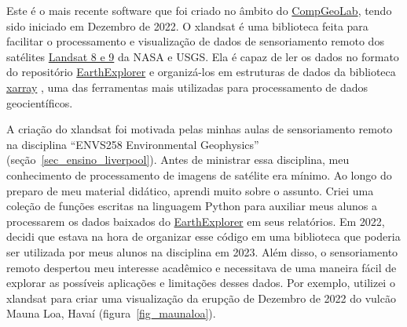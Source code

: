 \documentclass[10pt,a4paper,oneside]{book}
\begin{document}
Este é o mais recente software que foi criado no âmbito do
\href{https://www.compgeolab.org}{CompGeoLab}, tendo sido iniciado em Dezembro
de 2022.
O xlandsat é uma biblioteca feita para facilitar o processamento e visualização
de dados de sensoriamento remoto dos satélites
\href{https://en.wikipedia.org/wiki/Landsat_program}{Landsat 8 e 9} da
NASA e USGS.
Ela é capaz de ler os dados no formato do repositório
\href{https://earthexplorer.usgs.gov/}{EarthExplorer} e organizá-los em
estruturas de dados da biblioteca \href{https://xarray.dev/}{xarray}
\citep{Hoyer2017}, uma das ferramentas mais utilizadas para processamento de
dados geocientíficos.

A criação do xlandsat foi motivada pelas minhas aulas de sensoriamento
remoto na disciplina ``ENVS258 Environmental Geophysics''
(seção~\ref{sec_ensino_liverpool}).
Antes de ministrar essa disciplina, meu conhecimento de processamento de
imagens de satélite era mínimo.
Ao longo do preparo de meu material didático, aprendi muito sobre o assunto.
Criei uma coleção de funções escritas na linguagem Python para auxiliar meus
alunos a processarem os dados baixados do
\href{https://earthexplorer.usgs.gov/}{EarthExplorer} em seus relatórios.
Em 2022, decidi que estava na hora de organizar esse código em uma biblioteca
que poderia ser utilizada por meus alunos na disciplina em 2023.
Além disso, o sensoriamento remoto despertou meu interesse acadêmico e
necessitava de uma maneira fácil de explorar as possíveis aplicações e
limitações desses dados.
Por exemplo, utilizei o xlandsat para criar uma visualização da erupção de
Dezembro de 2022 do vulcão Mauna Loa, Havaí (figura~\ref{fig_maunaloa}).
\end{document}
